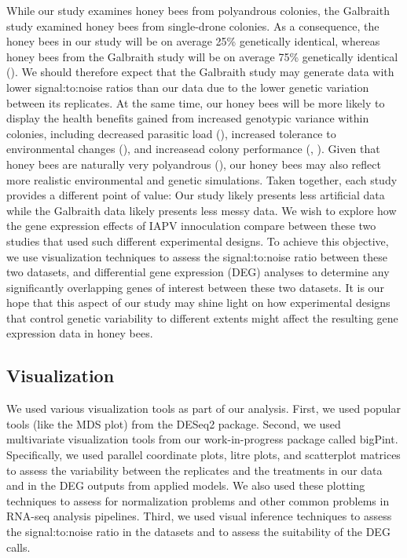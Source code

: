 \documentclass[11pt,a4paper,oldfontcommands,openany]{memoir}
\numberwithin{equation}{section} %
\begin{document}
While our study examines honey bees from polyandrous colonies, the Galbraith study examined honey bees from single-drone colonies. As a consequence, the honey bees in our study will be on average 25\% genetically identical, whereas honey bees from the Galbraith study will be on average 75\% genetically identical (\citealt{sisters}). We should therefore expect that the Galbraith study may generate data with lower signal:to:noise ratios than our data due to the lower genetic variation between its replicates. At the same time, our honey bees will be more likely to display the health benefits gained from increased genotypic variance within colonies, including decreased parasitic load (\citealt{multParasite}), increased tolerance to environmental changes (\citealt{divHyp2}), and increasead colony performance (\citealt{geneticDiverse}, \citealt{geneticDiverse2}). Given that honey bees are naturally very polyandrous (\citealt{patriline}), our honey bees may also reflect more realistic environmental and genetic simulations. Taken together, each study provides a different point of value: Our study likely presents less artificial data while the Galbraith data likely presents less messy data. We wish to explore how the gene expression effects of IAPV innoculation compare between these two studies that used such different experimental designs. To achieve this objective, we use visualization techniques to assess the signal:to:noise ratio between these two datasets, and differential gene expression (DEG) analyses to determine any significantly overlapping genes of interest between these two datasets. It is our hope that this aspect of our study may shine light on how experimental designs that control genetic variability to different extents might affect the resulting gene expression data in honey bees.

\subsection{Visualization}

We used various visualization tools as part of our analysis. First, we used popular tools (like the MDS plot) from the DESeq2 package. Second, we used multivariate visualization tools from our work-in-progress package called bigPint. Specifically, we used parallel coordinate plots, litre plots, and scatterplot matrices to assess the variability between the replicates and the treatments in our data and in the DEG outputs from applied models. We also used these plotting techniques to assess for normalization problems and other common problems in RNA-seq analysis pipelines. Third, we used visual inference techniques to assess the signal:to:noise ratio in the datasets and to assess the suitability of the DEG calls. 
\end{document}
